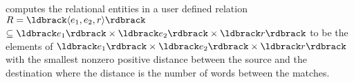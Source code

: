 
\framework computes the relational entities in a user defined 
relation $R=\ldbrack \langle e_1,e_2,r\rangle \rdbrack$
$\subseteq \ldbrack e_1 \rdbrack \times \ldbrack e_2 \rdbrack \times \ldbrack r \rdbrack$ 
to be the elements of $\ldbrack e_1 \rdbrack \times \ldbrack e_2 \rdbrack \times \ldbrack r \rdbrack$
with the smallest nonzero positive distance between the source and the destination
where the distance is the number of words between the matches. 

